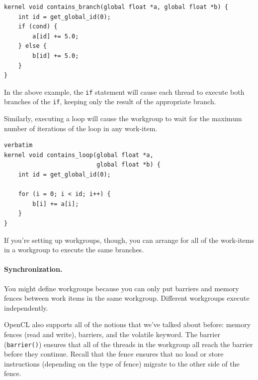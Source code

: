 {\scriptsize \hspace*{2em} \begin{minipage}{.5\textwidth}
    \begin{lstlisting}
kernel void contains_branch(global float *a, global float *b) {
    int id = get_global_id(0);
    if (cond) {
        a[id] += 5.0;
    } else {
        b[id] += 5.0;
    }
}
    \end{lstlisting}
      \end{minipage}}

In the above example, the {\tt if} statement will cause
each thread to execute both branches of the {\tt if}, keeping only the
result of the appropriate branch.

Similarly, executing a loop will cause the
workgroup to wait for the maximum number of iterations of the loop in
any work-item.

{\scriptsize \hspace*{2em} \begin{minipage}{.5\textwidth}
    \begin{lstlisting}verbatim
kernel void contains_loop(global float *a, 
                          global float *b) {
    int id = get_global_id(0);
    
    for (i = 0; i < id; i++) {
        b[i] += a[i];
    }
}
    \end{lstlisting}
\end{minipage} }

If you're setting up workgroups, though, you can arrange for all
of the work-items in a workgroup to execute the same branches.

\paragraph{Synchronization.} You might define
workgroups because you can only put barriers and memory fences between
work items in the same workgroup. Different workgroups execute
independently.

OpenCL also supports all of the notions that we've talked about
before: memory fences (read and write), barriers, and the volatile
keyword.  The barrier ({\tt barrier()}) ensures that all of the
threads in the workgroup all reach the barrier before they continue.
Recall that the fence ensures that no load or store instructions
(depending on the type of fence) migrate to the other side of the fence.

